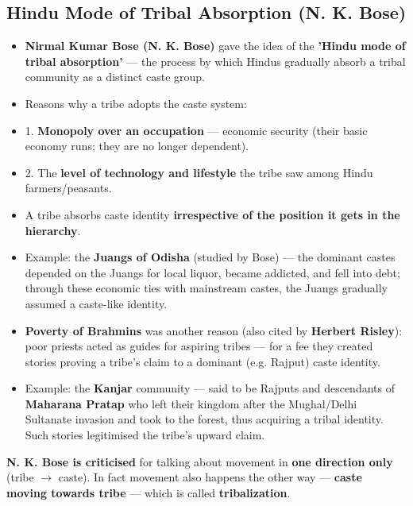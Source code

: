 \subsection{Hindu Mode of Tribal Absorption (N. K. Bose)}

\begin{KeyConcept}
\begin{itemize}
\item \textbf{Nirmal Kumar Bose (N. K. Bose)} gave the idea of the \textbf{'Hindu mode of tribal absorption'} --- the process by which Hindus gradually absorb a tribal community as a distinct caste group.
\item Reasons why a tribe adopts the caste system:
\item 1. \textbf{Monopoly over an occupation} --- economic security (their basic economy runs; they are no longer dependent).
\item 2. The \textbf{level of technology and lifestyle} the tribe saw among Hindu farmers/peasants.
\item A tribe absorbs caste identity \textbf{irrespective of the position it gets in the hierarchy}.
\end{itemize}
\end{KeyConcept}

\begin{ExampleBox}
\begin{itemize}
\item Example: the \textbf{Juangs of Odisha} (studied by Bose) --- the dominant castes depended on the Juangs for local liquor, became addicted, and fell into debt; through these economic ties with mainstream castes, the Juangs gradually assumed a caste-like identity.
\item \textbf{Poverty of Brahmins} was another reason (also cited by \textbf{Herbert Risley}): poor priests acted as guides for aspiring tribes --- for a fee they created stories proving a tribe's claim to a dominant (e.g. Rajput) caste identity.
\item Example: the \textbf{Kanjar} community --- said to be Rajputs and descendants of \textbf{Maharana Pratap} who left their kingdom after the Mughal/Delhi Sultanate invasion and took to the forest, thus acquiring a tribal identity. Such stories legitimised the tribe's upward claim.
\end{itemize}
\end{ExampleBox}

\begin{CriticalPoint}
\textbf{N. K. Bose is criticised} for talking about movement in \textbf{one direction only} (tribe $\rightarrow$ caste). In fact movement also happens the other way --- \textbf{caste moving towards tribe} --- which is called \textbf{tribalization}.
\end{CriticalPoint}

